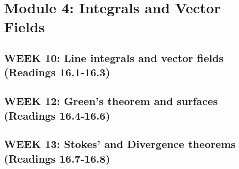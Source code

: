\documentclass[12pt]{article}
\begin{document}
\pagebreak
\section{Module 4: Integrals and Vector Fields}
\subsection{WEEK 10: Line integrals and vector fields (Readings 16.1-16.3)}

\subsection{WEEK 12: Green's theorem and surfaces (Readings 16.4-16.6)}

\subsection{WEEK 13: Stokes' and Divergence theorems (Readings 16.7-16.8)}
\end{document}
